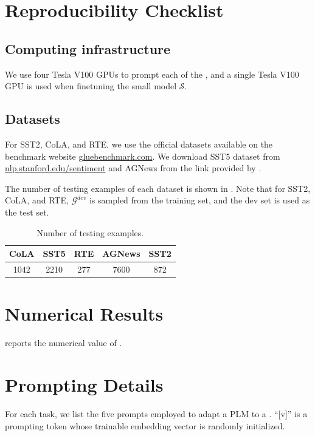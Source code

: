 \section{Reproducibility Checklist}
\subsection{Computing infrastructure}
We use four Tesla V100 GPUs to prompt
each of the \mdrs, and
a single Tesla V100 GPU
is used when finetuning the small model
$\mathcal{S}$.

\subsection{Datasets}
For SST2, CoLA, and RTE, we use the official datasets
available on the benchmark website
\url{gluebenchmark.com}.
We download
SST5 dataset from
\url{nlp.stanford.edu/sentiment}
and AGNews
from the link provided by \citet{agdataset}.

The number of testing examples of each dataset
is shown in .
Note that for SST2, CoLA, and RTE,
$\mathcal{G}^{dev}$ is sampled from
the training set, and the dev set is used as the test set.

\begin{table}[h]
\small\centering
\begin{tabular}{|c|c|c|c|c|}
\hline
CoLA & SST5 & RTE & AGNews & SST2 \\ \hline
1042 & 2210 & 277 & 7600   & 872  \\ \hline
\end{tabular}
\caption{Number of testing examples.}
\end{table}



\section{Numerical Results}
reports the numerical
value of .


\section{Prompting Details}
For each task, 
we list the five prompts
employed to adapt a PLM  to a \mdr.
``[v]'' is a prompting token whose
trainable embedding vector is 
randomly initialized.

